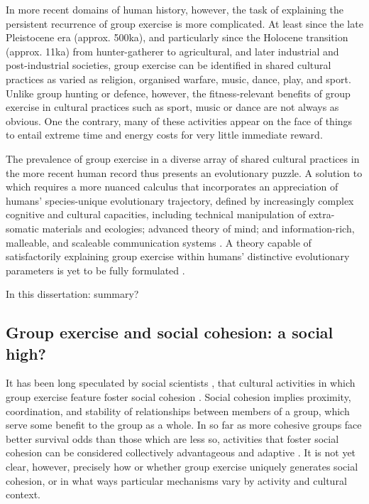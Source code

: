 \begin{CJK}{UTF8}{gbsn}
In more recent domains of human history, however, the task of explaining the persistent recurrence of group exercise is more complicated.  At least since the late Pleistocene era (approx. 500ka), and particularly since the Holocene transition (approx. 11ka) from hunter-gatherer to agricultural, and later industrial and post-industrial societies, group exercise can be identified in shared cultural practices as varied as religion, organised warfare, music, dance, play, and sport.  Unlike group hunting or defence, however, the fitness-relevant benefits of group exercise in cultural practices such as sport, music or dance are not always as obvious.  One the contrary, many of these activities appear on the face of things to entail extreme time and energy costs for very little immediate reward.

The prevalence of group exercise in a diverse array of shared cultural practices in the more recent human record thus presents an evolutionary puzzle.  A solution to which requires a more nuanced calculus that incorporates an appreciation of humans' species-unique evolutionary trajectory, defined by increasingly complex cognitive and cultural capacities, including technical manipulation of extra-somatic materials and ecologies; advanced theory of mind; and information-rich, malleable, and scaleable communication systems \citep{Roepstorff2010,Clark2015,Fuentes2016}.  A theory capable of satisfactorily explaining group exercise within humans' distinctive evolutionary parameters is yet to be fully formulated \citep{Cohen2017}.

In this dissertation: summary?

\subsection{Group exercise and social cohesion: a social high?}
It has been long speculated by social scientists \citep[see, for example][]{Mauss1935,Durkheim1965}, that cultural activities in which group exercise feature foster social cohesion \citep{Dunbar2010,Whitehouse2004}.  Social cohesion implies proximity, coordination, and stability of relationships between members of a group, which serve some benefit to the group as a whole.  In so far as more cohesive groups face better survival odds than those which are less so, activities that foster social cohesion can be considered collectively advantageous and adaptive \citep{Dunbar2010}.  It is not yet clear, however, precisely how or whether group exercise uniquely generates social cohesion, or in what ways particular mechanisms vary by activity and cultural context.


\end{CJK}
